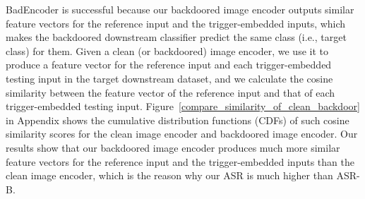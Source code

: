 BadEncoder is successful because our backdoored image encoder outputs similar feature vectors for the reference input and the trigger-embedded inputs, which makes the backdoored downstream classifier predict the same class (i.e., target class) for them.  
Given a clean (or backdoored) image encoder, we use it to produce a feature vector for the reference input and each trigger-embedded testing input in the target downstream dataset, and we calculate the cosine similarity between the feature vector of the reference input and that of each trigger-embedded testing input. Figure~\ref{compare_similarity_of_clean_backdoor} in Appendix shows the cumulative distribution functions (CDFs) of such cosine similarity scores for the clean image encoder and backdoored image encoder. Our results show that our backdoored image encoder produces much more similar feature vectors for the reference input and the trigger-embedded inputs than the clean image encoder, which is the reason why our ASR is much higher than ASR-B. 



